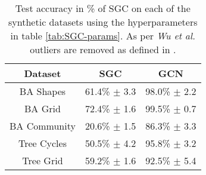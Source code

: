 \begin{table}
    \centering
    \begin{tabular}{c|c|c}
        \textbf{Dataset} & \textbf{SGC} & \textbf{GCN} \\
        \midrule
        BA Shapes       & 61.4\% $\pm$ 3.3 & 98.0\% $\pm$ 2.2\\
        BA Grid         & 72.4\% $\pm$ 1.6 & 99.5\% $\pm$ 0.7\\
        BA Community    & 20.6\% $\pm$ 1.5 & 86.3\% $\pm$ 3.3\\
        Tree Cycles     & 50.5\% $\pm$ 4.2 & 95.8\% $\pm$ 3.2\\
        Tree Grid       & 59.2\% $\pm$ 1.6 & 92.5\% $\pm$ 5.4\\
    \end{tabular}
    \caption{Test accuracy in \% of SGC on each of the synthetic datasets using the hyperparameters in table \ref{tab:SGC-params}. As per \textit{Wu et al.}\cite{wu2019simplifying} outliers are removed as defined in .}
    \label{tab:SGC-acc}
\end{table}

